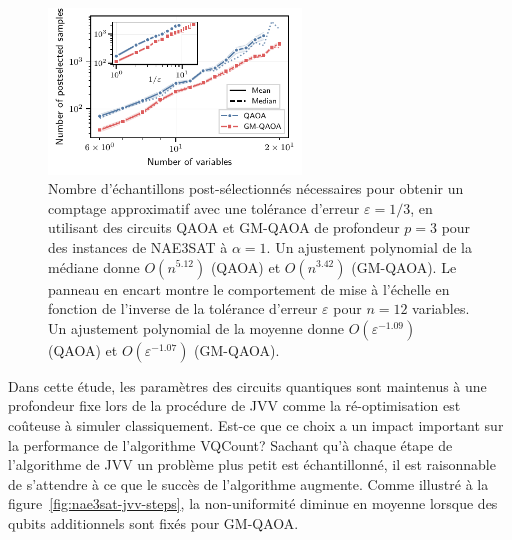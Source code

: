 \begin{figure}[H]
    \centering
    \includegraphics[width=0.6\textwidth]{figures/nae3sat-scaling.pdf}
    \caption[Comportement d'échelle du nombre d'échantillons post-sélectés pour \#NAE3SAT]{Nombre d'échantillons post-sélectionnés nécessaires pour obtenir un comptage approximatif avec une tolérance d'erreur $\varepsilon=1/3$, en utilisant des circuits QAOA et GM-QAOA de profondeur $p=3$ pour des instances de NAE3SAT à $\alpha=1$. Un ajustement polynomial de la médiane donne $O(n^{5.12})$ (QAOA) et $O(n^{3.42})$ (GM-QAOA). Le panneau en encart montre le comportement de mise à l'échelle en fonction de l'inverse de la tolérance d'erreur $\varepsilon$ pour $n=12$ variables. Un ajustement polynomial de la moyenne donne $O(\varepsilon^{-1.09})$ (QAOA) et $O(\varepsilon^{-1.07})$ (GM-QAOA).}
    \label{fig:nae3sat-scaling}
\end{figure}

Dans cette étude, les paramètres des circuits quantiques sont maintenus à une profondeur fixe lors de la procédure de JVV comme la ré-optimisation est coûteuse à simuler classiquement. Est-ce que ce choix a un impact important sur la performance de l'algorithme VQCount? Sachant qu'à chaque étape de l'algorithme de JVV un problème plus petit est échantillonné, il est raisonnable de s'attendre à ce que le succès de l'algorithme augmente. Comme illustré à la figure~\ref{fig:nae3sat-jvv-steps}, la non-uniformité diminue en moyenne lorsque des qubits additionnels sont fixés pour GM-QAOA. 


